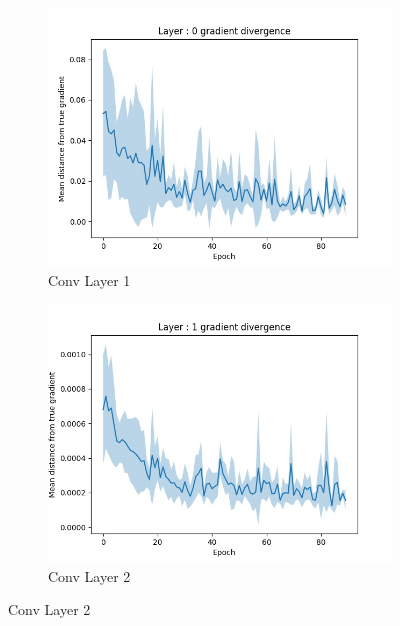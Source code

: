  \begin{figure}
\label{training_divergence}
        \centering
        \begin{subfigure}[b]{0.475\textwidth}
            \centering
            \includegraphics[width=\textwidth]{chapter_6_figures/cnn_weight_diff_0.jpg}
            \caption[Network2]%
            {{\small Conv Layer 1}}    
        \end{subfigure}
        \hfill
        \begin{subfigure}[b]{0.475\textwidth}  
            \centering 
            \includegraphics[width=\textwidth]{chapter_6_figures/cnn_weight_diff_1.jpg}
            \caption[]%
            {{\small Conv Layer 2}}    
        \end{subfigure}

\end{figure}
